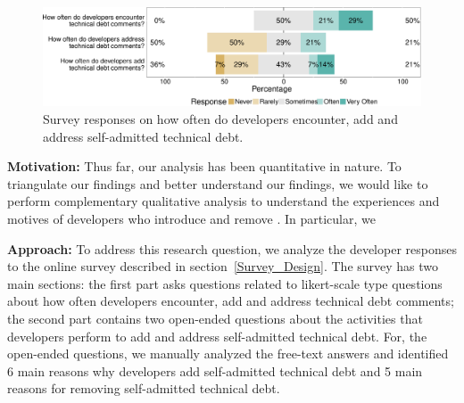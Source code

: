 
\begin{figure}[!tb]
	\centering
	\includegraphics[width=\columnwidth]{figures/test/responses_question.pdf}
	\caption{Survey responses on how often do developers encounter, add and address self-admitted technical debt.}
	\label{fig:encouner_add_address}
\end{figure}


 \noindent\rqiv

\noindent \textbf{Motivation:} 
Thus far, our analysis has been quantitative in nature. To triangulate our findings and better understand our findings, we would like to perform complementary qualitative analysis to understand the experiences and motives of developers who introduce and remove \SATD. In particular, we 


 
\noindent \textbf{Approach:} 
To address this research question, we analyze the developer responses to the online survey described in section~\ref{Survey_Design}. The survey has two main sections: the first part asks questions related to likert-scale type questions about how often developers encounter, add and address technical debt comments; the second part contains two open-ended questions about the activities that developers perform to add and address self-admitted technical debt. For, the open-ended questions, we manually analyzed the free-text answers and identified 6 main reasons why developers add self-admitted technical debt and 5 main reasons for removing self-admitted technical debt.

